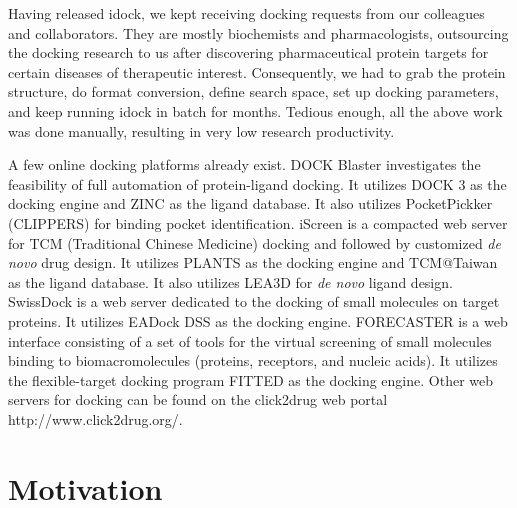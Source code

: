 Having released idock, we kept receiving docking requests from our colleagues and collaborators. They are mostly biochemists and pharmacologists, outsourcing the docking research to us after discovering pharmaceutical protein targets for certain diseases of therapeutic interest. Consequently, we had to grab the protein structure, do format conversion, define search space, set up docking parameters, and keep running idock in batch for months. Tedious enough, all the above work was done manually, resulting in very low research productivity.

A few online docking platforms already exist. DOCK Blaster \citep{557} investigates the feasibility of full automation of protein-ligand docking. It utilizes DOCK 3 \citep{1445} as the docking engine and ZINC \citep{532,1178} as the ligand database. It also utilizes PocketPickker (CLIPPERS) \citep{395} for binding pocket identification. iScreen \citep{899} is a compacted web server for TCM (Traditional Chinese Medicine) docking and followed by customized \textit{de novo} drug design. It utilizes PLANTS \citep{610,607,779} as the docking engine and TCM@Taiwan \citep{528} as the ligand database. It also utilizes LEA3D \citep{1223} for \textit{de novo} ligand design. SwissDock \citep{1425} is a web server dedicated to the docking of small molecules on target proteins. It utilizes EADock DSS \citep{606,781} as the docking engine. FORECASTER \citep{1012} is a web interface consisting of a set of tools for the virtual screening of small molecules binding to biomacromolecules (proteins, receptors, and nucleic acids). It utilizes the flexible-target docking program FITTED \citep{602} as the docking engine. Other web servers for docking can be found on the click2drug web portal http://www.click2drug.org/.%

\section{Motivation}

